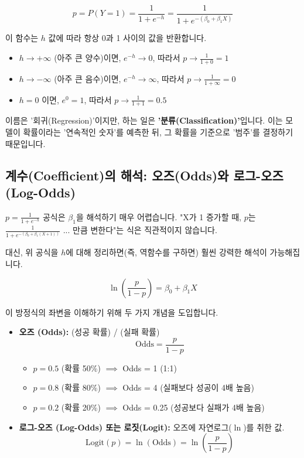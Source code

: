 \documentclass[11pt,a4paper]{book}
\theoremstyle{definition}
\begin{document}
$$ p = P(Y=1) = \frac{1}{1 + e^{-h}} = \frac{1}{1 + e^{-(\beta_0 + \beta_1 X)}} $$

이 함수는 $h$ 값에 따라 항상 0과 1 사이의 값을 반환합니다.
\begin{itemize}
    \item $h \to +\infty$ (아주 큰 양수)이면, $e^{-h} \to 0$, 따라서 $p \to \frac{1}{1+0} = 1$
    \item $h \to -\infty$ (아주 큰 음수)이면, $e^{-h} \to \infty$, 따라서 $p \to \frac{1}{1+\infty} = 0$
    \item $h = 0$ 이면, $e^{0} = 1$, 따라서 $p \to \frac{1}{1+1} = 0.5$
\end{itemize}

\begin{tcolorbox}[colback=gray!5, colframe=gray!60, title={로지스틱 회귀의 이름}]
    이름은 '회귀(Regression)'이지만, 하는 일은 \textbf{'분류(Classification)'}입니다.
    이는 모델이 확률이라는 '연속적인 숫자'를 예측한 뒤, 그 확률을 기준으로 '범주'를 결정하기 때문입니다.
\end{tcolorbox}


\subsection{계수(Coefficient)의 해석: 오즈(Odds)와 로그-오즈(Log-Odds)}

$p = \frac{1}{1 + e^{-h}}$ 공식은 $\beta_1$을 해석하기 매우 어렵습니다.
"X가 1 증가할 때, $p$는 $\frac{1}{1 + e^{-(\beta_0 + \beta_1 (X+1))}}$ ... 만큼 변한다"는 식은 직관적이지 않습니다.

대신, 위 공식을 $h$에 대해 정리하면(즉, 역함수를 구하면) 훨씬 강력한 해석이 가능해집니다.

$$ \ln\left( \frac{p}{1-p} \right) = \beta_0 + \beta_1 X $$

이 방정식의 좌변을 이해하기 위해 두 가지 개념을 도입합니다.

\begin{itemize}
    \item \textbf{오즈 (Odds):} (성공 확률) / (실패 확률)
    $$ \text{Odds} = \frac{p}{1-p} $$
    \begin{itemize}
        \item $p=0.5$ (확률 50\%) $\implies$ Odds = 1 (1:1)
        \item $p=0.8$ (확률 80\%) $\implies$ Odds = 4 (실패보다 성공이 4배 높음)
        \item $p=0.2$ (확률 20\%) $\implies$ Odds = 0.25 (성공보다 실패가 4배 높음)
    \end{itemize}
    \item \textbf{로그-오즈 (Log-Odds) 또는 로짓(Logit):} 오즈에 자연로그($\ln$)를 취한 값.
    $$ \text{Logit}(p) = \ln(\text{Odds}) = \ln\left( \frac{p}{1-p} \right) $$
\end{itemize}
\end{document}
